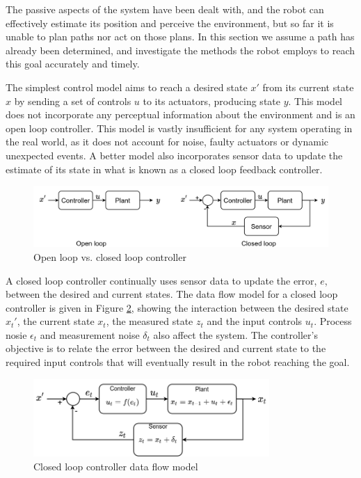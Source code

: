 The passive aspects of the system have been dealt with, and the robot can effectively estimate its position and perceive the environment, but so far it is unable to plan paths nor act on those plans. In this section we assume a path has already been determined, and investigate the methods the robot employs to reach this goal accurately and timely.

The simplest control model aims to reach a desired state $x'$ from its current state $x$ by sending a set of controls $u$ to its actuators, producing state $y$. This model does not incorporate any perceptual information about the environment and is an open loop controller. This model is vastly insufficient for any system operating in the real world, as it does not account for noise, faulty actuators or dynamic unexpected events. A better model also incorporates sensor data to update the estimate of its state in what is known as a closed loop feedback controller.

\begin{figure}[H]
    \centering
    \includegraphics[width=\textwidth]{figures/open_loop.png}
    \caption{Open loop vs. closed loop controller}
    \label{fig:open_loop}
\end{figure}

A closed loop controller continually uses sensor data to update the error, $e$, between the desired and current states. The data flow model for a closed loop controller is given in Figure \ref{fig:closed_loop}, showing the interaction between the desired state $x_t'$, the current state $x_t$, the measured state $z_t$ and the input controls $u_t$. Process nosie $\epsilon_t$ and measurement noise $\delta_t$ also affect the system. The controller's objective is to relate the error between the desired and current state to the required input controls that will eventually result in the robot reaching the goal.

\begin{figure}[H]
    \centering
    \includegraphics[width=0.8\textwidth]{figures/closed_loop.png}
    \caption{Closed loop controller data flow model}
    \label{fig:closed_loop}
\end{figure}

